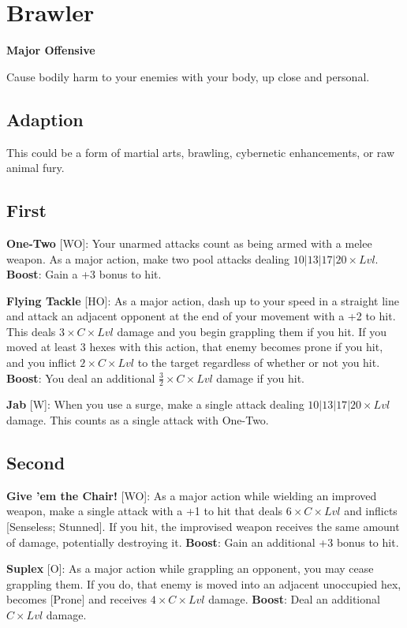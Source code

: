 \section{Brawler}
\textbf{Major Offensive}

Cause bodily harm to your enemies with your body, up close and personal.

\subsection*{Adaption}
This could be a form of martial arts, brawling, cybernetic enhancements, or raw animal fury.


\begin{multicols*}{2}
\subsection*{First \Facet\perk}
\textbf{One-Two} [WO]: Your unarmed attacks count as being armed with a melee weapon. As a major action, make two pool attacks dealing $10|13|17|20 \times Lvl$. \textbf{Boost}: Gain a +3 bonus to hit.

\textbf{Flying Tackle} [HO]: As a major action, dash up to your speed in a straight line and attack an adjacent opponent at the end of your movement with a +2 to hit. This deals $3\times C\times Lvl$ damage and you begin grappling them if you hit. If you moved at least 3 hexes with this action, that enemy becomes prone if you hit, and you inflict $2\times C\times Lvl$ to the target regardless of whether or not you hit. \textbf{Boost}: You deal an additional $\frac{3}{2} \times C\times Lvl$ damage if you hit.

\textbf{Jab} [W]: When you use a surge, make a single attack dealing $10|13|17|20 \times Lvl$ damage. This counts as a single attack with One-Two.

\subsection*{Second \Facet\perk}
\textbf{Give 'em the Chair!} [WO]: As a major action while wielding an improved weapon, make a single attack with a +1 to hit that deals $6 \times C \times Lvl$ and inflicts [Senseless; Stunned]. If you hit, the improvised weapon receives the same amount of damage, potentially destroying it.  \textbf{Boost}: Gain an additional +3 bonus to hit.

\textbf{Suplex} [O]: As a major action while grappling an opponent, you may cease grappling them. If you do, that enemy is moved into an adjacent unoccupied hex, becomes [Prone] and receives $4 \times C\times Lvl$ damage. \textbf{Boost}: Deal an additional $C\times Lvl$ damage.


\end{multicols*}
